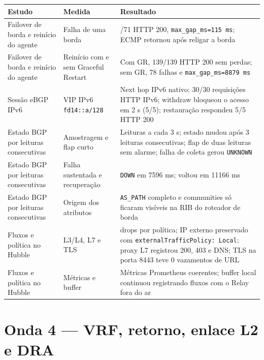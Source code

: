 \documentclass[12pt,openany,oneside,a4paper,chapter=TITLE,english,brazil]{abntex2}
\begin{document}
\begin{quadro}[!htbp]
\caption{Resultados de failover e observabilidade}
\footnotesize
\begin{tabularx}{\textwidth}{|>{\raggedright\arraybackslash\hsize=0.791\hsize}X|>{\raggedright\arraybackslash\hsize=0.759\hsize}X|>{\raggedright\arraybackslash\hsize=1.451\hsize}X|}
\hline
\textbf{Estudo} & \textbf{Medida} & \textbf{Resultado} \\
\hline
Failover de borda e reinício do agente & Falha de uma borda & 71/71 HTTP 200,
\texttt{max\_\allowbreak{}gap\_\allowbreak{}ms=\allowbreak{}115 ms};
ECMP retornou após religar a borda \\
\hline
Failover de borda e reinício do agente & Reinício com e sem Graceful Restart & Com GR, 139/139 HTTP 200 sem perdas; sem GR, 78 falhas e
\texttt{max\_\allowbreak{}gap\_\allowbreak{}ms=\allowbreak{}8879 ms} \\
\hline
Sessão eBGP IPv6 & VIP IPv6 \texttt{fd14:\allowbreak{}:\allowbreak{}a/\allowbreak{}128} & Next hop IPv6 nativo; 30/30 requisições HTTP IPv6; withdraw bloqueou o
acesso em 2 s (5/5); restauração respondeu 5/5 HTTP 200 \\
\hline
Estado BGP por leituras consecutivas & Amostragem e flap curto & Leituras a cada 3 s; estado mudou após 3 leituras consecutivas; flap de
duas leituras sem alarme; falha de coleta gerou \texttt{UNKNOWN} \\
\hline
Estado BGP por leituras consecutivas & Falha sustentada e recuperação & \texttt{DOWN} em 7596 ms; voltou em 11166 ms \\
\hline
Estado BGP por leituras consecutivas & Origem dos atributos & \texttt{AS\_\allowbreak{}PATH} completo e communities só ficaram
visíveis na RIB do roteador de borda \\
\hline
Fluxos e política no Hubble & L3/L4, L7 e TLS & 10 drops por política; IP externo preservado com
\texttt{external\allowbreak{}Traffic\allowbreak{}Policy:\allowbreak{} Local};
proxy L7 registrou 200, 403 e DNS; TLS na porta 8443 teve 0 vazamentos
de URL \\
\hline
Fluxos e política no Hubble & Métricas e buffer & Métricas Prometheus coerentes; buffer local continuou registrando fluxos
com o Relay fora do ar \\
\hline
\end{tabularx}
\end{quadro}

\section{Onda 4 --- VRF, retorno, enlace L2 e DRA}\label{onda-4-vrf-retorno-enlace-l2-e-dra}
\end{document}
